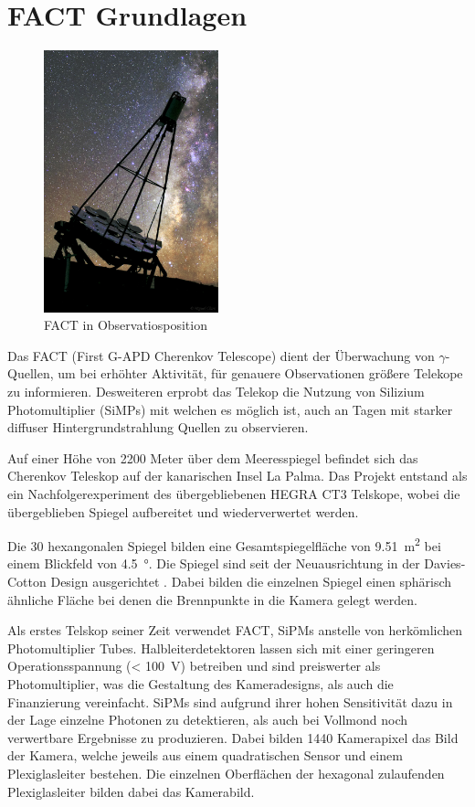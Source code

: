 \chapter{FACT Grundlagen}
\begin{figure}
  \includegraphics[width=0.45\textwidth]{./images/FACT.jpg}
  \caption{FACT in Observatiosposition \cite{factpic}}
  \label{fig:observ}
\end{figure}
Das FACT (First G-APD Cherenkov Telescope) dient der Überwachung von $\gamma$-Quellen, um bei erhöhter Aktivität, für genauere Observationen größere Telekope zu informieren. 
Desweiteren erprobt das Telekop die Nutzung von Silizium Photomultiplier (SiMPs) mit welchen es möglich ist, auch an Tagen mit starker diffuser Hintergrundstrahlung Quellen zu observieren. 

Auf einer Höhe von 2200 Meter über dem Meeresspiegel befindet sich das Cherenkov Teleskop auf der kanarischen Insel La Palma. 
Das Projekt entstand als ein Nachfolgerexperiment des übergebliebenen HEGRA CT3 Telskope, wobei die übergeblieben Spiegel aufbereitet und wiederverwertet werden.

Die 30 hexangonalen Spiegel bilden eine Gesamtspiegelfläche von \SI{9.51}{\meter\squared} bei einem Blickfeld von \SI{4.5}{\degree}. 
Die Spiegel sind seit der Neuausrichtung in der Davies-Cotton Design ausgerichtet \cite{design-detec}.
Dabei bilden die einzelnen Spiegel einen sphärisch ähnliche Fläche bei denen die Brennpunkte in die Kamera gelegt werden.

Als erstes Telskop seiner Zeit verwendet FACT, SiPMs anstelle von herkömlichen Photomultiplier Tubes. 
Halbleiterdetektoren lassen sich mit einer geringeren Operationsspannung (< \SI{100}{\volt}) betreiben und sind preiswerter als Photomultiplier, was die Gestaltung des Kameradesigns, als auch die Finanzierung vereinfacht. 
SiPMs sind aufgrund ihrer hohen Sensitivität dazu in der Lage einzelne Photonen zu detektieren, als auch bei Vollmond noch verwertbare Ergebnisse zu produzieren.
Dabei bilden 1440 Kamerapixel das Bild der Kamera, welche jeweils aus einem quadratischen Sensor und einem Plexiglasleiter bestehen. Die einzelnen Oberflächen der hexagonal zulaufenden Plexiglasleiter bilden dabei das Kamerabild.

